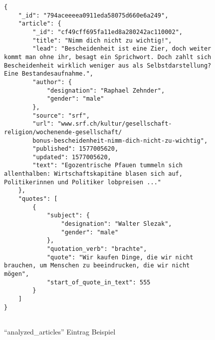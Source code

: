 \newpage

\begin{figure}[H]
	\begin{lstlisting}
{
    "_id": "794aceeeea0911eda58075d660e6a249",
    "article": {
        "_id": "cf49cff695fa11ed8a280242ac110002",
        "title": "Nimm dich nicht zu wichtig!",
        "lead": "Bescheidenheit ist eine Zier, doch weiter kommt man ohne ihr, besagt ein Sprichwort. Doch zahlt sich Bescheidenheit wirklich weniger aus als Selbstdarstellung? Eine Bestandesaufnahme.",
        "author": {
            "designation": "Raphael Zehnder",
            "gender": "male"
        },
        "source": "srf",
        "url": "www.srf.ch/kultur/gesellschaft-religion/wochenende-gesellschaft/
        bonus-bescheidenheit-nimm-dich-nicht-zu-wichtig",
        "published": 1577005620,
        "updated": 1577005620,
        "text": "Egozentrische Pfauen tummeln sich allenthalben: Wirtschaftskapitäne blasen sich auf, Politikerinnen und Politiker lobpreisen ..."
    },
    "quotes": [
        {
            "subject": {
                "designation": "Walter Slezak",
                "gender": "male"
            },
            "quotation_verb": "brachte",
            "quote": "Wir kaufen Dinge, die wir nicht brauchen, um Menschen zu beeindrucken, die wir nicht mögen",
            "start_of_quote_in_text": 555
        }
    ]
}
        
	\end{lstlisting}
	\caption{\enquote{analyzed\_articles}  Eintrag Beispiel}
	\label{analyzed-article}
\end{figure}